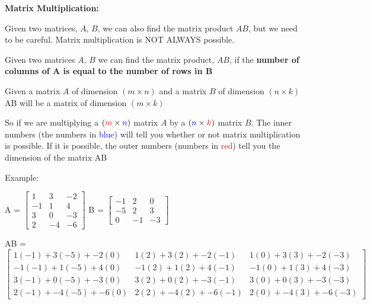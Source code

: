 \documentclass[12pt]{article}
\newenvironment{myindentpar}[1]%
     {\begin{list}{}%
             {\setlength{\leftmargin}{#1}}%
             \item[]%
     }
     {\end{list}}
\begin{document}
\vspace{1cm}

\textbf{Matrix Multiplication:}

\begin{itemize}
\item Given two matrices, $A$, $B$, we can also find the matrix product $AB$, but we need to be careful. Matrix multiplication is NOT ALWAYS possible.
\item Given two matrices $A$, $B$ we can find the matrix product, $AB$, if the \textbf{number of columns of A is equal to the number of rows in B}
\item Given a matrix $A$ of dimension $(m \times n)$ and a matrix $B$ of dimension $(n \times k)$ AB will be a matrix of dimension $(m \times k)$
\item So if we are multiplying a $(\textcolor{red}{m} \times \textcolor{blue}{n})$ matrix $A$ by a $(\textcolor{blue}{n} \times \textcolor{red}{k})$ matrix $B$. The inner numbers (the numbers in \textcolor{blue}{blue}) will tell you whether or not matrix multiplication is possible. If it is possible, the outer numbers (numbers in \textcolor{red}{red}) tell you the dimension of the matrix AB

\begin{myindentpar}{1cm}
Example:

A = $\begin{bmatrix}                                        
       1 & 3 & -2           \\[1em]			
       -1 & 1           & 4 \\[1em]       		
       3          & 0 & -3 \\[1em]	
       2          & -4 & -6			
     \end{bmatrix}$ \hspace{1cm}
B = $\begin{bmatrix}                                        
       -1 & 2 & 0           \\[1em]			
       -5 & 2           & 3 \\[1em]       		
       0          & -1 & -3				
     \end{bmatrix}$

\vspace{1cm}

\centerline{
AB = $\begin{bmatrix}                                        
       1(-1) + 3(-5) + -2(0) & 1(2) + 3(2) + -2(-1) & 1(0) + 3(3) + -2(-3)           \\[1.5em]			
       -1(-1) + 1(-5) + 4(0) & -1(2) + 1(2) + 4(-1)           & -1(0) + 1(3) + 4(-3) \\[1.5em]       		
       3(-1) + 0(-5) + -3(0)          & 3(2) + 0(2) + -3(-1) & 3(0) + 0(3) + -3(-3)  \\[1.5em]   
       2(-1) + -4(-5) + -6(0)          & 2(2) + -4(2) + -6(-1) & 2(0) + -4(3) + -6(-3)			
     \end{bmatrix}$}


\end{myindentpar}
\end{itemize}
\end{document}
